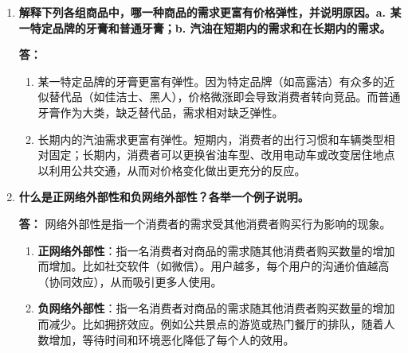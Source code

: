 \begin{enumerate}[label=\textbf{\arabic*.}, leftmargin=*]
		\newpage
		\item \textbf{解释下列各组商品中，哪一种商品的需求更富有价格弹性，并说明原因。a. 某一特定品牌的牙膏和普通牙膏；b. 汽油在短期内的需求和在长期内的需求。}
		
		\textbf{答：}
		\begin{enumerate}[label=\alph*., leftmargin=*]
			\item 某一特定品牌的牙膏更富有弹性。因为特定品牌（如高露洁）有众多的近似替代品（如佳洁士、黑人），价格微涨即会导致消费者转向竞品。而普通牙膏作为大类，缺乏替代品，需求相对缺乏弹性。
			\item 长期内的汽油需求更富有弹性。短期内，消费者的出行习惯和车辆类型相对固定；长期内，消费者可以更换省油车型、改用电动车或改变居住地点以利用公共交通，从而对价格变化做出更充分的反应。
		\end{enumerate}
		
		\item \textbf{什么是正网络外部性和负网络外部性？各举一个例子说明。}
		
		\textbf{答：}
		网络外部性是指一个消费者的需求受其他消费者购买行为影响的现象。
		\begin{enumerate}[label=\arabic*., leftmargin=*]
			\item \textbf{正网络外部性}：指一名消费者对商品的需求随其他消费者购买数量的增加而增加。比如社交软件（如微信）。用户越多，每个用户的沟通价值越高（协同效应），从而吸引更多人使用。

			\item \textbf{负网络外部性}：指一名消费者对商品的需求随其他消费者购买数量的增加而减少。比如拥挤效应。例如公共景点的游览或热门餐厅的排队，随着人数增加，等待时间和环境恶化降低了每个人的效用。

		\end{enumerate}
		
		
		
	\end{enumerate}
	
